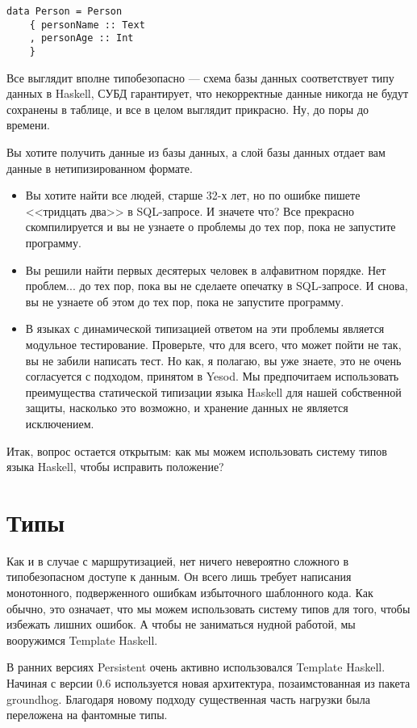 \begin{lstlisting}
data Person = Person
    { personName :: Text
    , personAge :: Int
    }
\end{lstlisting}

Все выглядит вполне типобезопасно --- схема базы данных соответствует типу данных в Haskell, СУБД гарантирует, что некорректные данные никогда не будут сохранены в таблице, и все в целом выглядит прикрасно. Ну, до поры до времени.

Вы хотите получить данные из базы данных, а слой базы данных отдает вам данные в нетипизированном формате.

\begin{itemize}
  \item Вы хотите найти все людей, старше 32-х лет, но по ошибке пишете <<тридцать два>> в SQL-запросе. И значете что? Все прекрасно скомпилируется и вы не узнаете о проблемы до тех пор, пока не запустите программу.
  \item Вы решили найти первых десятерых человек в алфавитном порядке. Нет проблем... до тех пор, пока вы не сделаете опечатку в SQL-запросе. И снова, вы не узнаете об этом до тех пор, пока не запустите программу.
  \item В языках с динамической типизацией ответом на эти проблемы является модульное тестирование. Проверьте, что для всего, что может пойти не так, вы не забили написать тест. Но как, я полагаю, вы уже знаете, это не очень согласуется с подходом, принятом в Yesod. Мы предпочитаем использовать преимущества статической типизации языка Haskell для нашей собственной защиты, насколько это возможно, и хранение данных не является исключением.
\end{itemize}

Итак, вопрос остается открытым: как мы можем использовать систему типов языка Haskell, чтобы исправить положение?

\section{Типы} %

Как и в случае с маршрутизацией, нет ничего невероятно сложного в типобезопасном доступе к данным. Он всего лишь требует написания монотонного, подверженного ошибкам избыточного шаблонного кода. Как обычно, это означает, что мы можем использовать систему типов для того, чтобы избежать лишних ошибок. А чтобы не заниматься нудной работой, мы вооружимся Template Haskell.

\begin{remark}
В ранних версиях Persistent очень активно использовался Template Haskell. Начиная с версии 0.6 используется новая архитектура, позаимстованная из пакета groundhog. Благодаря новому подходу существенная часть нагрузки была переложена на фантомные типы.
\end{remark}

